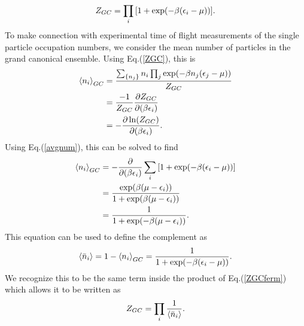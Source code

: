\begin{equation}
    Z_{GC}=\prod_{i}\qty[1+\exp(-\beta\qty(\epsilon_i-\mu))]. \label{ZGCferm}
\end{equation}
To make connection with experimental time of flight measurements of the single particle occupation numbers, we consider the mean number of particles in the grand canonical ensemble. Using Eq.\@ (\ref{ZGC}), this is 
\begin{align}
    \left<{n_i}\right>_{GC}&=\frac{\sum_{\{n_j\}} n_i \prod_j \exp(-\beta n_j(\epsilon_j-\mu))}{Z_{GC}}\nonumber\\
    &=\frac{-1}{Z_{GC}}\frac{\partial Z_{GC}}{\partial (\beta\epsilon_i)}\nonumber\\
    &=-\frac{\partial \ln(Z_{GC})}{\partial (\beta \epsilon_i)}. \label{avgnum}
\end{align}
Using Eq.\@ (\ref{avgnum}), this can be solved to find 
\begin{align}
    \left<{n_i}\right>_{GC}&=-\frac{\partial}{\partial (\beta\epsilon_i)} \sum_i \qty[1+\exp(-\beta\qty(\epsilon_i-\mu))]\nonumber\\
    &=\frac{\exp(\beta(\mu-\epsilon_i))}{1+\exp(\beta(\mu-\epsilon_i))}\nonumber\\
    &=\frac{1}{1+\exp(-\beta(\mu-\epsilon_i))}. \label{GCoccprob}
\end{align}
This equation can be used to define the complement as
\begin{equation}
    \left<{\Bar{n}_i}\right>=1-\left<{n_i}\right>_{GC}=\frac{1}{1+\exp(-\beta(\epsilon_i-\mu))}. \label{GCcomplement}
\end{equation}
We recognize this to be the same term inside the product of Eq.\@ (\ref{ZGCferm}) which allows it to be written as 
\begin{equation}
    Z_{GC}=\prod_i \frac{1}{\left<{\Bar{n}_i}\right>}. \label{GCq}
\end{equation}

